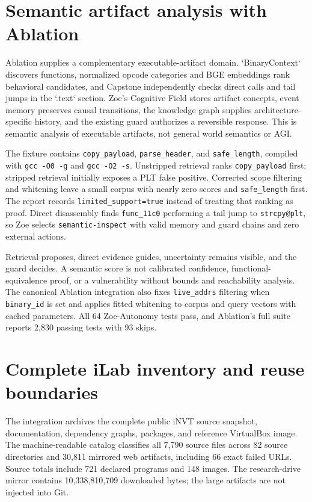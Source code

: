 \section{Semantic artifact analysis with Ablation}
Ablation supplies a complementary executable-artifact domain. `BinaryContext` discovers functions, normalized opcode categories and BGE embeddings rank behavioral candidates, and Capstone independently checks direct calls and tail jumps in the `.text` section. Zoe's Cognitive Field stores artifact concepts, event memory preserves causal transitions, the knowledge graph supplies architecture-specific history, and the existing guard authorizes a reversible response. This is semantic analysis of executable artifacts, not general world semantics or AGI.

The fixture contains \texttt{copy\_payload}, \texttt{parse\_header}, and \texttt{safe\_length}, compiled with \texttt{gcc -O0 -g} and \texttt{gcc -O2 -s}. Unstripped retrieval ranks \texttt{copy\_payload} first; stripped retrieval initially exposes a PLT false positive. Corrected scope filtering and whitening leave a small corpus with nearly zero scores and \texttt{safe\_length} first. The report records \texttt{limited\_support=true} instead of treating that ranking as proof. Direct disassembly finds \texttt{func\_11c0} performing a tail jump to \texttt{strcpy@plt}, so Zoe selects \texttt{semantic-inspect} with valid memory and guard chains and zero external actions.

Retrieval proposes, direct evidence guides, uncertainty remains visible, and the guard decides. A semantic score is not calibrated confidence, functional-equivalence proof, or a vulnerability without bounds and reachability analysis. The canonical Ablation integration also fixes \texttt{live\_addrs} filtering when \texttt{binary\_id} is set and applies fitted whitening to corpus and query vectors with cached parameters. All 64 Zoe-Autonomy tests pass, and Ablation's full suite reports 2,830 passing tests with 93 skips.

\section{Complete iLab inventory and reuse boundaries}
The integration archives the complete public iNVT source snapshot, documentation, dependency graphs, packages, and reference VirtualBox image. The machine-readable catalog classifies all 7,790 source files across 82 source directories and 30,811 mirrored web artifacts, including 66 exact failed URLs. Source totals include 721 declared programs and 148 images. The research-drive mirror contains 10,338,810,709 downloaded bytes; the large artifacts are not injected into Git.

